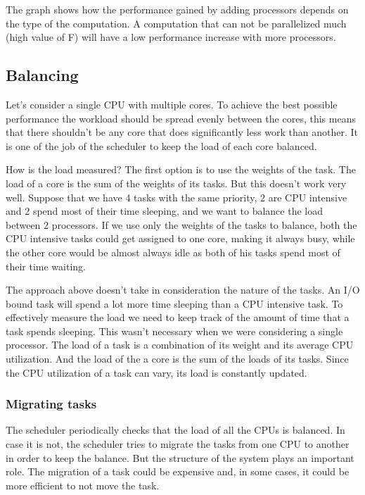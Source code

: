 The graph shows how the performance gained by adding processors depends on the type of the computation. A computation that can not be parallelized much (high value of F) will have a low performance increase with more processors. 

\subsection{Balancing}

Let's consider a single CPU with multiple cores. To achieve the best possible performance the workload should be spread evenly between the cores, this means that there shouldn't be any core that does significantly less work than another. It is one of the job of the scheduler to keep the load of each core balanced. 

How is the load measured? The first option is to use the weights of the task. The load of a core is the sum of the weights of its tasks. But this doesn't work very well. Suppose that we have 4 tasks with the same priority, 2 are CPU intensive and 2 spend most of their time sleeping, and we want to balance the load between 2 processors. If we use only the weights of the tasks to balance, both the CPU intensive tasks could get assigned to one core, making it always busy, while the other core would be almost always idle as both of his tasks spend most of their time waiting.

The approach above doesn't take in consideration the nature of the tasks. An I/O bound task will spend a lot more time sleeping than a CPU intensive task. To effectively measure the load we need to keep track of the amount of time that a task spends sleeping. This wasn't necessary when we were considering a single processor. The load of a task is a combination of its weight and its average CPU utilization. And the load of the a core is the sum of the loads of its tasks. Since the CPU utilization of a task can vary, its load is constantly updated.

\subsubsection{Migrating tasks}
The scheduler periodically checks that the load of all the CPUs is balanced. In case it is not, the scheduler tries to migrate the tasks from one CPU to another in order to keep the balance. But the structure of the system plays an important role. The migration of a task could be expensive and, in some cases, it could be more efficient to not move the task.

